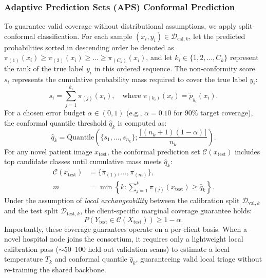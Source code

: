 \documentclass[journal]{IEEEtran}
\begin{document}
\subsubsection{Adaptive Prediction Sets (APS) Conformal Prediction}
To guarantee valid coverage without distributional assumptions, we apply split-conformal classification. For each sample $(x_i, y_i) \in \mathcal{D}_{\text{cal}, k}$, let the predicted probabilities sorted in descending order be denoted as $\pi_{(1)}(x_i) \ge \pi_{(2)}(x_i) \ge \dots \ge \pi_{(C_k)}(x_i)$, and let $k_i \in \{1, 2, \dots, C_k\}$ represent the rank of the true label $y_i$ in this ordered sequence. The non-conformity score $s_i$ represents the cumulative probability mass required to cover the true label $y_i$:
\begin{equation}
s_i = \sum_{j=1}^{k_i} \pi_{(j)}(x_i), \quad \text{where } \pi_{(k_i)}(x_i) = \tilde{p}_{y_i}(x_i).
\end{equation}
For a chosen error budget $\alpha \in (0, 1)$ (e.g., $\alpha = 0.10$ for $90\%$ target coverage), the conformal quantile threshold $\hat{q}_k$ is computed as:
\begin{equation}
\hat{q}_k = \text{Quantile}\left( \{s_1, \dots, s_{n_k}\}; \frac{\lceil (n_k + 1)(1 - \alpha) \rceil}{n_k} \right).
\end{equation}
For any novel patient image $x_{\text{test}}$, the conformal prediction set $\mathcal{C}(x_{\text{test}})$ includes top candidate classes until cumulative mass meets $\hat{q}_k$:
\begin{equation}
\begin{aligned}
\mathcal{C}(x_{\text{test}}) &= \{ \pi_{(1)}, \dots, \pi_{(m)} \}, \\
m &= \min \left\{ k : \sum_{j=1}^k \pi_{(j)}(x_{\text{test}}) \ge \hat{q}_k \right\}.
\end{aligned}
\end{equation}
Under the assumption of \textit{local exchangeability} between the calibration split $\mathcal{D}_{\text{val}, k}$ and the test split $\mathcal{D}_{\text{test}, k}$, the client-specific marginal coverage guarantee holds:
\begin{equation}
P\left( Y_{\text{test}} \in \mathcal{C}(X_{\text{test}}) \right) \ge 1 - \alpha.
\end{equation}
Importantly, these coverage guarantees operate on a per-client basis. When a novel hospital node joins the consortium, it requires only a lightweight local calibration pass ($\sim 50\text{--}100$ held-out validation scans) to estimate a local temperature $T_k$ and conformal quantile $\hat{q}_k$, guaranteeing valid local triage without re-training the shared backbone.
\end{document}
